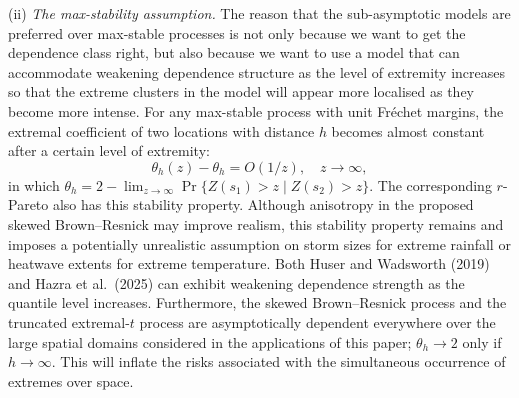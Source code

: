 \documentclass[12pt
]{article}
\begin{document}
\begin{Res}
\end{Res}

\begin{Comments}
(ii) \emph{The max-stability assumption.} The reason that the sub-asymptotic models are preferred over max-stable processes is not only because we want to get the dependence class right, but also because we want to use a model that can accommodate weakening dependence structure as the level of extremity increases so that the extreme clusters in the model will appear more localised as they become more intense. For any max-stable process with unit Fr\'{e}chet margins, the extremal coefficient of two locations with distance $h$ becomes almost constant after a certain level of extremity:
\[
  \theta_h(z) - \theta_h = O(1/z), \quad z\to\infty,
\]
in which $\theta_h = 2 - \lim_{z\to\infty}\Pr\{Z(s_1)>z \mid Z(s_2)>z\}$. The corresponding $r$-Pareto also has this stability property. Although anisotropy in the proposed skewed Brown--Resnick may improve realism, this stability property remains and imposes a potentially unrealistic assumption on storm sizes for extreme rainfall or heatwave extents for extreme temperature. Both Huser and Wadsworth (2019) and Hazra et al.\ (2025) can exhibit weakening dependence strength as the quantile level increases. Furthermore, the skewed Brown--Resnick process and the truncated extremal-$t$ process are asymptotically dependent everywhere over the large spatial domains considered in the applications of this paper; $\theta_h \to 2$ only if $h\to\infty$. This will inflate the risks associated with the simultaneous occurrence of extremes over space.
\end{Comments}

\begin{Res}
\end{Res}
\end{document}
